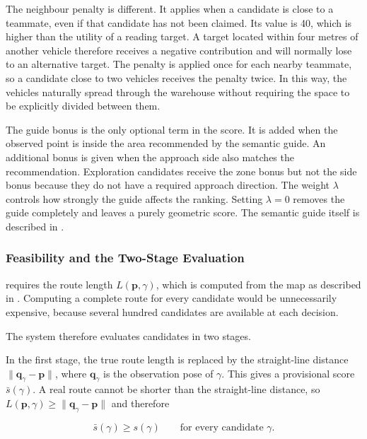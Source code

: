 The neighbour penalty is different. It applies when a candidate is close to a
teammate, even if that candidate has not been claimed. Its value is 40, which is
higher than the utility of a reading target. A target located within four metres
of another vehicle therefore receives a negative contribution and will normally
lose to an alternative target. The penalty is applied once for each nearby
teammate, so a candidate close to two vehicles receives the penalty twice. In
this way, the vehicles naturally spread through the warehouse without requiring
the space to be explicitly divided between them.

The guide bonus is the only optional term in the score. It is added when the
observed point is inside the area recommended by the semantic guide. An
additional bonus is given when the approach side also matches the recommendation.
Exploration candidates receive the zone bonus but not the side bonus because they
do not have a required approach direction. The weight $\lambda$ controls how
strongly the guide affects the ranking. Setting $\lambda = 0$ removes the guide
completely and leaves a purely geometric score. The semantic guide itself is
described in .

\subsubsection*{Feasibility and the Two-Stage Evaluation}

 requires the route length $L(\mathbf{p},\gamma)$, which is
computed from the map as described in . Computing a complete
route for every candidate would be unnecessarily expensive, because several
hundred candidates are available at each decision.

The system therefore evaluates candidates in two stages.

In the first stage, the true route length is replaced by the straight-line
distance $\lVert \mathbf{q}_{\gamma}-\mathbf{p}\rVert$, where
$\mathbf{q}_{\gamma}$ is the observation pose of $\gamma$. This gives a
provisional score $\bar{s}(\gamma)$. A real route cannot be shorter than the
straight-line distance, so
$L(\mathbf{p},\gamma) \geq \lVert \mathbf{q}_{\gamma}-\mathbf{p}\rVert$ and
therefore

\begin{equation}
    \bar{s}(\gamma) \geq s(\gamma)
    \qquad \text{for every candidate } \gamma.
    \label{eq:sys:bound}
\end{equation}

